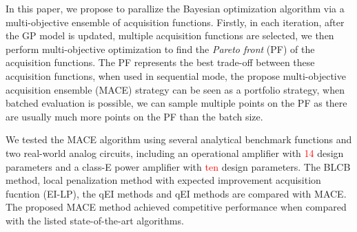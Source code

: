 In this paper, we propose to parallize the Bayesian optimization algorithm via
a multi-objective ensemble of acquisition functions. Firstly, in each
iteration, after the GP model is updated, multiple acquisition functions are
selected, we then perform multi-objective optimization to find the \emph{Pareto
front} (PF) of the acquisition functions. The PF represents the best trade-off
between these acquisition functions, when used in sequential mode, the propose
multi-objective acquisition ensemble (MACE) strategy can be seen as a portfolio
strategy, when batched evaluation is possible, we can sample multiple points on
the PF as there are usually much more points on the PF than the batch size.

We tested the MACE algorithm using several analytical benchmark functions and
two real-world analog circuits, including an operational amplifier with
\textcolor{red}{14} design parameters and a class-E power amplifier with
\textcolor{red}{ten} design parameters. The BLCB method, local penalization
method with expected improvement acquisition fucntion (EI-LP), the qEI methods
and qEI methods are compared with MACE. The proposed MACE method achieved
competitive performance when compared with the listed state-of-the-art
algorithms.
